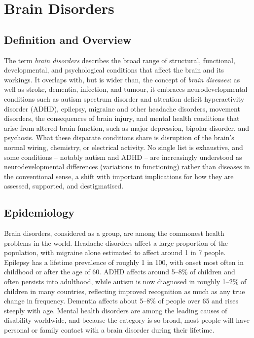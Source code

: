 \chapter{Brain Disorders}

\section*{Definition and Overview}
The term \emph{brain disorders} describes the broad range of structural, functional, developmental, and psychological conditions that affect the brain and its workings. It overlaps with, but is wider than, the concept of \emph{brain diseases}: as well as stroke, dementia, infection, and tumour, it embraces neurodevelopmental conditions such as autism spectrum disorder and attention deficit hyperactivity disorder (ADHD), epilepsy, migraine and other headache disorders, movement disorders, the consequences of brain injury, and mental health conditions that arise from altered brain function, such as major depression, bipolar disorder, and psychosis. What these disparate conditions share is disruption of the brain's normal wiring, chemistry, or electrical activity. No single list is exhaustive, and some conditions -- notably autism and ADHD -- are increasingly understood as neurodevelopmental differences (variations in functioning) rather than diseases in the conventional sense, a shift with important implications for how they are assessed, supported, and destigmatised.

\section*{Epidemiology}
Brain disorders, considered as a group, are among the commonest health problems in the world. Headache disorders affect a large proportion of the population, with migraine alone estimated to affect around 1 in 7 people. Epilepsy has a lifetime prevalence of roughly 1 in 100, with onset most often in childhood or after the age of 60. ADHD affects around 5--8\% of children and often persists into adulthood, while autism is now diagnosed in roughly 1--2\% of children in many countries, reflecting improved recognition as much as any true change in frequency. Dementia affects about 5--8\% of people over 65 and rises steeply with age. Mental health disorders are among the leading causes of disability worldwide, and because the category is so broad, most people will have personal or family contact with a brain disorder during their lifetime.

